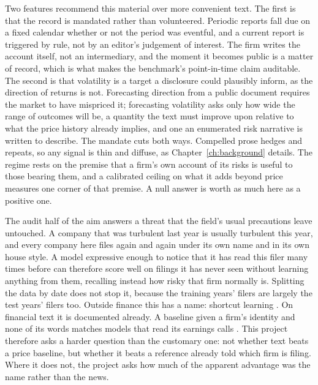 Two features recommend this material over more convenient text. The first is that the record is mandated rather than volunteered. Periodic reports fall due on a fixed calendar whether or not the period was eventful, and a current report is triggered by rule, not by an editor's judgement of interest. The firm writes the account itself, not an intermediary, and the moment it becomes public is a matter of record, which is what makes the benchmark's point-in-time claim auditable. The second is that volatility is a target a disclosure could plausibly inform, as the direction of returns is not. Forecasting direction from a public document requires the market to have mispriced it; forecasting volatility asks only how wide the range of outcomes will be, a quantity the text must improve upon relative to what the price history already implies, and one an enumerated risk narrative is written to describe. The mandate cuts both ways. Compelled prose hedges and repeats, so any signal is thin and diffuse, as Chapter~\ref{ch:background} details. The regime rests on the premise that a firm's own account of its risks is useful to those bearing them, and a calibrated ceiling on what it adds beyond price measures one corner of that premise. A null answer is worth as much here as a positive one.

The audit half of the aim answers a threat that the field's usual precautions leave untouched. A company that was turbulent last year is usually turbulent this year, and every company here files again and again under its own name and in its own house style. A model expressive enough to notice that it has read this filer many times before can therefore score well on filings it has never seen without learning anything from them, recalling instead how risky that firm normally is. Splitting the data by date does not stop it, because the training years' filers are largely the test years' filers too. Outside finance this has a name: shortcut learning \cite{geirhos2020shortcut}. On financial text it is documented already. A baseline given a firm's identity and none of its words matches models that read its earnings calls \cite{yu2025samecompany}. This project therefore asks a harder question than the customary one: not whether text beats a price baseline, but whether it beats a reference already told which firm is filing. Where it does not, the project asks how much of the apparent advantage was the name rather than the news.

